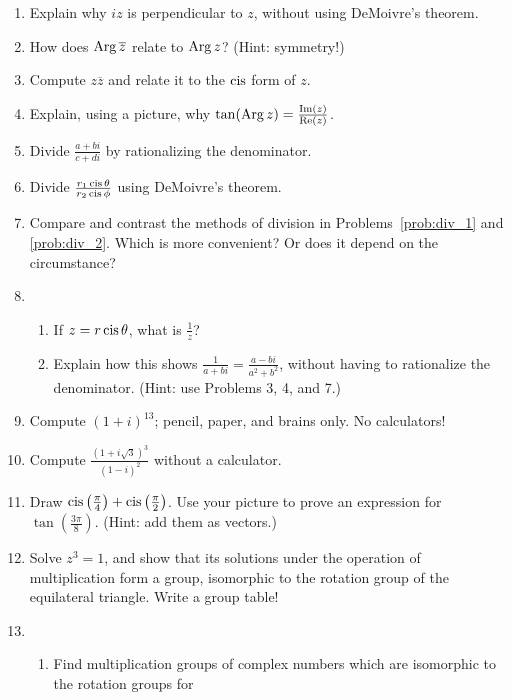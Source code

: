 \documentclass[../textbook.tex]{subfiles}
\begin{document}
\begin{enumerate}
\item Explain why $iz$ is perpendicular to $z$, without using DeMoivre's theorem.
\item How does $\operatorname{Arg} \overline{z}$ relate to $\operatorname{Arg} z$? (Hint: symmetry!)
\item Compute $z\overline{z}$ and relate it to the $\operatorname{cis}$ form of $z$.
\item Explain, using a picture, why $\tan (\operatorname{Arg} z) = \frac{\operatorname{Im}(z)}{\operatorname{Re}(z)}$.
\item Divide $\frac{a+bi}{c+di}$ by rationalizing the denominator.~\label{prob:div_1}
\item Divide $\frac{r_1\operatorname{cis} \theta}{r_2\operatorname{cis} \phi}$ using DeMoivre's theorem.~\label{prob:div_2}
\item Compare and contrast the methods of division in Problems~\ref{prob:div_1} and \ref{prob:div_2}. Which is more convenient? Or does it depend on the circumstance?
\item \begin{enumerate}
\item If $z = r\operatorname{cis} \theta$, what is $\frac{1}{z}$?
\item Explain how this shows $\frac{1}{a+bi}=\frac{a-bi}{a^2+b^2}$, without having to rationalize the denominator. (Hint: use Problems 3, 4, and 7.)
\end{enumerate}
\item Compute $(1+i)^{13}$; pencil, paper, and brains only. No calculators!
\item Compute $\frac{(1+i\sqrt{3})^3}{(1-i)^2}$ without a calculator.
\item Draw $\operatorname{cis}\left(\frac{\pi}{4}\right) + \operatorname{cis}\left(\frac{\pi}{2}\right)$. Use your picture to prove an expression for $\tan\left(\frac{3\pi}{8}\right)$. (Hint: add them as vectors.)
\item Solve $z^3 = 1$, and show that its solutions under the operation of multiplication form a group, isomorphic to the rotation group of the equilateral triangle. Write a group table!
\item \begin{enumerate}
\item Find multiplication groups of complex numbers which are isomorphic to the rotation groups for
\begin{enumerate}
\end{enumerate}
\end{enumerate}
\end{enumerate}
\end{document}
